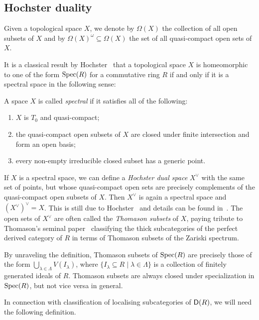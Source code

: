 \documentclass[reqno,a4paper]{amsart}
\begin{document}
\subsection{Hochster duality}
\label{subsec:Hochster}

Given a topological space $X$, we denote by $\Omega(X)$ the collection of all open subsets of $X$ and by $\Omega(X)^\omega\subseteq\Omega(X)$ the set of all quasi-compact open sets of $X$.

It is a classical result by Hochster~\cite{hochster} that a topological space $X$ is homeomorphic to one of the form $\operatorname{Spec}(R)$ for a commutative ring $R$ if and only if it is a spectral space in the following sense:

\begin{definition} \label{def:spectral}
A space $X$ is called \emph{spectral} if it satisfies all of the following:
\begin{enumerate}
\item $X$ is $T_0$ and quasi-compact;
\item the quasi-compact open subsets of $X$ are closed under finite intersection and form an open basis;
\item every non-empty irreducible closed subset has a generic point.
\end{enumerate}
\end{definition}

If $X$ is a spectral space, we can define a \emph{Hochster dual space} $X^\vee$ with the same set of points, but whose quasi-compact open sets are precisely complements of the quasi-compact open subsets of $X$. Then $X^\vee$ is again a spectral space and $(X^{\vee})^\vee=X$.
This is still due to Hochster~\cite{hochster} and details can be found in~\cite[Ch.~1]{dst19}.
The open sets of $X^\vee$ are often called the \emph{Thomason subsets} of $X$, paying tribute to Thomason's seminal paper~\cite{Thomason:1997} classifying the thick subcategories of the perfect derived category of $R$ in terms of Thomason subsets of the Zariski spectrum.

By unraveling the definition, Thomason subsets of $\operatorname{Spec}(R)$ are precisely those of the form $\bigcup_{\lambda\in\Lambda}V(I_\lambda)$, where $\{ I_\lambda\subseteq R\mid \lambda\in\Lambda\}$ is a collection of finitely generated ideals of $R$. Thomason subsets are always closed under specialization in $\operatorname{Spec}(R)$, but not vice versa in general.

In connection with classification of localising subcategories of $\mathsf{D}(R)$, we will need the following definition. 
\end{document}
